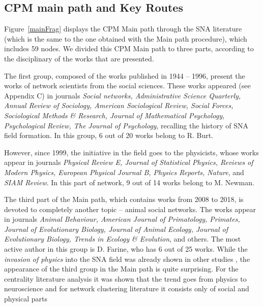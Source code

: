 \documentclass[11pt]{article} %
\begin{document}
\subsection{CPM main path and Key Routes}  

Figure~\ref{mainFrag} displays the CPM Main path through the SNA literature (which is the same to the one obtained with the Main path procedure), which includes 59 nodes. We divided this CPM Main path to three parts, according to the disciplinary of the works that are presented. \medskip 

The first group, composed of the works published in 1944 -- 1996, present the works of network scientists from the social sciences. These works appeared (see Appendix C) in journals \textit{Social networks, Administrative Science Quarterly, Annual Review of Sociology, American Sociological Review, Social Forces, Sociological Methods \& Research, Journal of Mathematical Psychology, Psychological Review, The Journal of Psychology}, recalling the history of SNA field formation. In this group, 6 out of 20 works belong to R. Burt. \medskip 

However, since 1999, the initiative in the field goes to the physicists, whose works appear in journals \textit{Physical Review E, Journal of Statistical Physics, Reviews of Modern Physics, European Physical Journal B, Physics Reports, Nature}, and \textit{SIAM Review}. In this part of network, 9 out of 14 works belong to M. Newman. \medskip 

The third part of the Main path, which contains works from 2008 to 2018, is devoted to completely another topic -- animal social networks. The works appear in journals \textit{Animal Behaviour, American Journal of Primatology, Primates, Journal of Evolutionary Biology, Journal of Animal Ecology, Journal of Evolutionary Biology, Trends in Ecology \& Evolution}, and others. The most active author in this group is D. Farine, who has 6 out of 25 works. While the \textit{invasion of physics} into the SNA field was already shown in other studies \citep{lazer,brandes}, the appearance of the third group in the Main path is quite surprising. For the centrality literature analysis it was shown that the trend goes from physics to neuroscience \citep{Understand} and for network clustering literature it consists only of social and physical parts \citep{batagelj2019}  \medskip  
\end{document}
